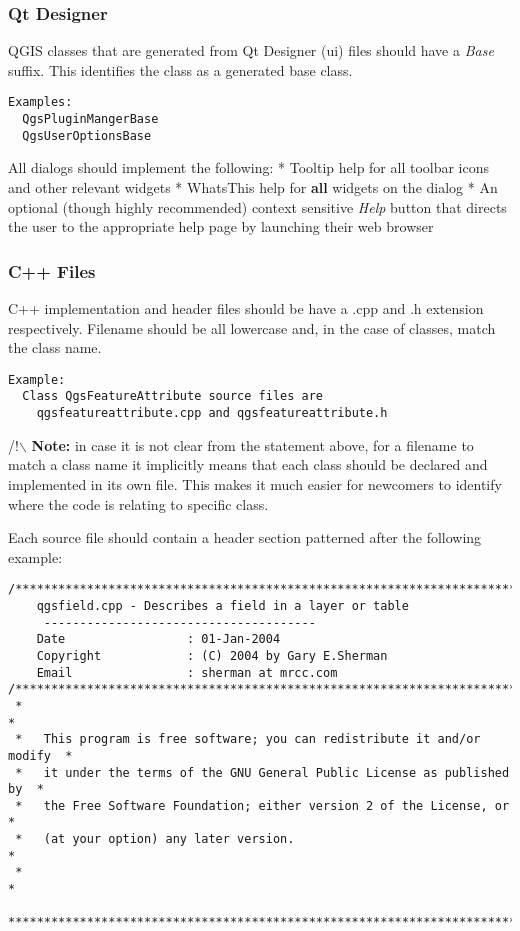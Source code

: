 \subsubsection{Qt Designer}
QGIS classes that are generated from Qt Designer (ui) files should have a
\textit{Base} suffix. This identifies the class as a generated base class.

\begin{verbatim}
Examples:
  QgsPluginMangerBase
  QgsUserOptionsBase
\end{verbatim}
All dialogs should implement the following:
 * Tooltip help for all toolbar icons and other relevant widgets
 * WhatsThis help for \textbf{all} widgets on the dialog
 * An optional (though highly recommended) context sensitive \textit{Help} button
   that directs the user to the appropriate help page by launching their web
   browser

\subsubsection{C++ Files}
C++ implementation and header files should be have a .cpp and .h extension
respectively.  Filename should be all lowercase and, in the case of classes,
match the class name.

\begin{verbatim}
Example:
  Class QgsFeatureAttribute source files are 
    qgsfeatureattribute.cpp and qgsfeatureattribute.h
\end{verbatim}

/!$\backslash$ \textbf{Note:} in case it is not clear from the statement above, for a filename 
to match a class name it implicitly means that each class should be declared 
and implemented in its own file. This makes it much easier for newcomers to 
identify where the code is relating to specific class.

Each source file should contain a header section patterned after the following
example:

\begin{verbatim}
/***************************************************************************
    qgsfield.cpp - Describes a field in a layer or table
     --------------------------------------
    Date                 : 01-Jan-2004
    Copyright            : (C) 2004 by Gary E.Sherman
    Email                : sherman at mrcc.com
/***************************************************************************
 *                                                                         *
 *   This program is free software; you can redistribute it and/or modify  *
 *   it under the terms of the GNU General Public License as published by  *
 *   the Free Software Foundation; either version 2 of the License, or     *
 *   (at your option) any later version.                                   *
 *                                                                         *
 ***************************************************************************/
\end{verbatim}

